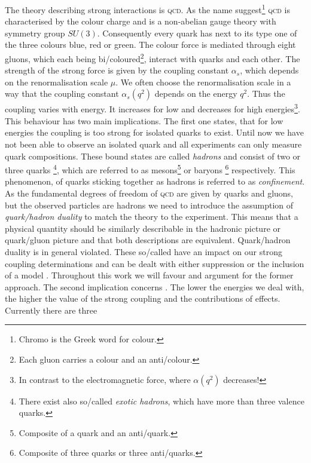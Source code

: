 \documentclass[../../index.tex]{subfiles}
\begin{document}
The theory describing strong interactions is \textsc{qcd}. As the name
suggest\footnote{Chromo is the Greek word for colour.} \textsc{qcd} is
characterised by the colour charge and is a non-abelian gauge theory with
symmetry group \(SU(3)\). Consequently every quark has next to its type one of
the three colours blue, red or green. The colour force is mediated through eight
gluons, which each being bi\-/coloured\footnote{Each gluon carries a colour and
  an anti\-/colour.}, interact with quarks and each other. The strength of the
strong force is given by the coupling constant \(\alpha_s\), which depends on
the renormalisation scale \(\mu\). We often choose the renormalisation scale in
a way that the coupling constant \(\alpha_s(q^2)\) depends on the energy
\(q^2\). Thus the coupling varies with energy. It increases for low and
decreases for high energies\footnote{In contrast to the electromagnetic force,
  where \(\alpha(q^2)\) decreases!}. This behaviour has two main implications.
The first one states, that for low energies the coupling is too strong for
isolated quarks to exist. Until now we have not been able to observe an isolated
quark and all experiments can only measure quark compositions. These bound
states are called \textit{hadrons} and consist of two or three quarks
\footnote{There exist also so\-/called \textit{exotic hadrons}, which have more
  than three valence quarks.}, which are referred to as
mesons\footnote{Composite of a quark and an anti\-/quark.} or baryons
\footnote{Composite of three quarks or three anti\-/quarks.} respectively. This
phenomenon, of quarks sticking together as hadrons is referred to as
\textit{confinement}. As the fundamental degrees of freedom of \textsc{qcd} are
given by quarks and gluons, but the observed particles are hadrons we need to
introduce the assumption of \textit{quark\-/hadron duality} to match the theory
to the experiment. This means that a physical quantity should be similarly
describable in the hadronic picture or quark\-/gluon picture and that both
descriptions are equivalent. Quark\-/hadron duality is in general violated.
These so\-/called  have an impact on our strong
coupling determinations and can be dealt with either suppression or the
inclusion of a model \cite{Cata2008}. Throughout this work we will favour and
argument for the former approach. The second implication concerns
. The lower the energies we deal with, the
higher the value of the strong coupling and the contributions of
 effects. Currently there are three
\end{document}
